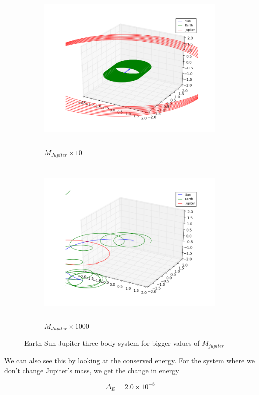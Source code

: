 \documentclass[%
 reprint,
 nobalance,
 amsmath,amssymb,
 aps,
]{revtex4-1}
\begin{document}
 \begin{figure}[H]
     \centering
     \begin{subfigure}[h]{0.5\textwidth}
         \centering
         \includegraphics[height=3.2in, width=0.99\textwidth]{plot/earth_sun_jupiter_mj10.png}
         \caption{$M_{Jupiter}\times 10$}
     \end{subfigure}
     \begin{subfigure}[h]{0.5\textwidth}
         \centering
         \includegraphics[height=3.2in, width=0.99\textwidth]{plot/earth_sun_jupiter_mj1000.png}
         \caption{$M_{Jupiter}\times 1000$}
     \end{subfigure}
     \caption{Earth-Sun-Jupiter three-body system for bigger values of $M_{jupiter}$}\label{fig:2}
 \end{figure}

We can also see this by looking at the conserved energy. For the system where we don't change Jupiter's mass, we get the change in energy

\begin{equation}
\Delta_{E} = 2.0\times 10^{-8}
\end{equation}
\end{document}
